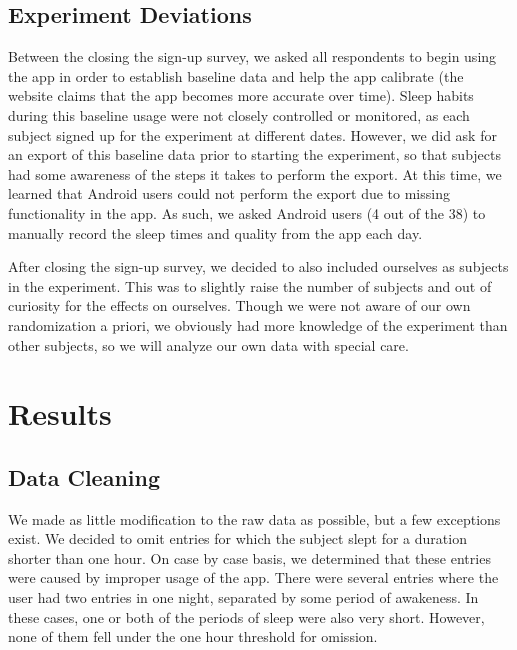 \documentclass[12pt,]{article}
\begin{document}
\hypertarget{experiment-deviations}{%
\subsection{Experiment Deviations}\label{experiment-deviations}}

Between the closing the sign-up survey, we asked all respondents to
begin using the app in order to establish baseline data and help the app
calibrate (the website claims that the app becomes more accurate over
time). Sleep habits during this baseline usage were not closely
controlled or monitored, as each subject signed up for the experiment at
different dates. However, we did ask for an export of this baseline data
prior to starting the experiment, so that subjects had some awareness of
the steps it takes to perform the export. At this time, we learned that
Android users could not perform the export due to missing functionality
in the app. As such, we asked Android users (4 out of the 38) to
manually record the sleep times and quality from the app each day.

After closing the sign-up survey, we decided to also included ourselves
as subjects in the experiment. This was to slightly raise the number of
subjects and out of curiosity for the effects on ourselves. Though we
were not aware of our own randomization a priori, we obviously had more
knowledge of the experiment than other subjects, so we will analyze our
own data with special care.

\hypertarget{results}{%
\section{Results}\label{results}}

\hypertarget{data-cleaning}{%
\subsection{Data Cleaning}\label{data-cleaning}}

We made as little modification to the raw data as possible, but a few
exceptions exist. We decided to omit entries for which the subject slept
for a duration shorter than one hour. On case by case basis, we
determined that these entries were caused by improper usage of the app.
There were several entries where the user had two entries in one night,
separated by some period of awakeness. In these cases, one or both of
the periods of sleep were also very short. However, none of them fell
under the one hour threshold for omission.
\end{document}
